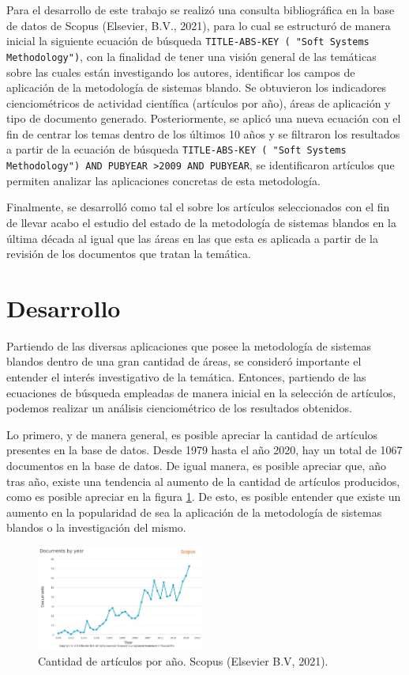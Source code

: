 \documentclass[10pt,letterpaper,twoside,twocolumn]{article}   %
\begin{document}
Para el desarrollo de este trabajo se realizó una consulta bibliográfica en la base de datos de Scopus (Elsevier, B.V., 2021), para lo cual se estructuró de manera inicial la siguiente ecuación de búsqueda \texttt{TITLE-ABS-KEY ( "Soft Systems Methodology")}, con la finalidad de tener una visión general de las temáticas sobre las cuales están investigando los autores, identificar los campos de aplicación de la metodología de sistemas blando.  Se obtuvieron los indicadores cienciométricos de actividad científica (artículos por año), áreas de aplicación y tipo de documento generado.  
Posteriormente, se aplicó una nueva ecuación con el fin de centrar los temas dentro de los últimos 10 años y  se filtraron los resultados a partir de la ecuación de búsqueda \texttt{TITLE-ABS-KEY ( "Soft Systems Methodology") AND PUBYEAR >2009 AND PUBYEAR}, se identificaron artículos que permiten analizar las aplicaciones concretas de esta metodología.

Finalmente, se desarrolló como tal el  sobre los artículos seleccionados con el fin de llevar acabo el estudio del estado de la metodología de sistemas blandos en la última década al igual que las áreas en las que esta es aplicada a partir de la revisión de los documentos que tratan la temática. 

\section{Desarrollo}
Partiendo de las diversas aplicaciones que posee la metodología de sistemas blandos dentro de una gran cantidad de áreas, se consideró importante el entender el interés investigativo de la temática. Entonces, partiendo de las ecuaciones de búsqueda empleadas de manera inicial en la selección de artículos, podemos realizar un análisis cienciométrico de los resultados obtenidos. 

Lo primero, y de manera general, es posible apreciar la cantidad de artículos presentes en la base de datos. Desde 1979 hasta el año 2020, hay un total de 1067 documentos en la base de datos. De igual manera, es posible apreciar que, año tras año, existe una tendencia al aumento de la cantidad de artículos producidos, como es posible apreciar en la figura \ref{yearResults}. De esto, es posible entender que existe un aumento en la popularidad de sea la aplicación de la metodología de sistemas blandos o la investigación del mismo.

\begin{figure}
  \centering
      \includegraphics[width=0.49\textwidth]{Images/1979-2020.jpg}
  \caption{Cantidad de artículos por año. Scopus (Elsevier B.V, 2021).}
  \label{yearResults}
\end{figure}
\end{document}
